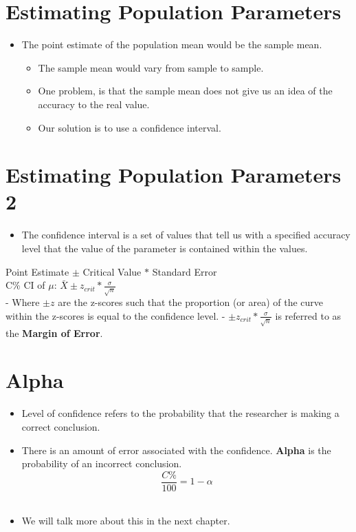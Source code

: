 \documentclass[12pt]{article}
\begin{document}
\section{Estimating Population
Parameters}\label{estimating-population-parameters}

\begin{itemize}
\itemsep1pt\parskip0pt
\item
  The point estimate of the population mean would be the sample mean.

  \begin{itemize}
  \itemsep1pt\parskip0pt
  \item
    The sample mean would vary from sample to sample.
  \item
    One problem, is that the sample mean does not give us an idea of the
    accuracy to the real value.
  \item
    Our solution is to use a confidence interval.
  \end{itemize}
\end{itemize}

\section{Estimating Population Parameters
2}\label{estimating-population-parameters-2}

\begin{itemize}
\itemsep1pt\parskip0pt
\item
  The confidence interval is a set of values that tell us with a
  specified accuracy level that the value of the parameter is contained
  within the values.
\end{itemize}

Point Estimate \(\pm\) Critical Value \(*\) Standard Error\\C\% CI of
\(\mu\): \(\bar{X} \pm z_{crit} * \frac{\sigma}{\sqrt{n}}\)\\- Where
\(\pm z\) are the z-scores such that the proportion (or area) of the
curve within the z-scores is equal to the confidence level. -
\(\pm z_{crit} * \frac{\sigma}{\sqrt{n}}\) is referred to as the
\textbf{Margin of Error}.

\section{Alpha}\label{alpha}

\begin{itemize}
\itemsep1pt\parskip0pt
\item
  Level of confidence refers to the probability that the researcher is
  making a correct conclusion.\\
\item
  There is an amount of error associated with the confidence.
  \textbf{Alpha} is the probability of an incorrect
  conclusion.\\\[ \frac{C\%}{100} = 1 - \alpha \]\\
\item
  We will talk more about this in the next chapter.
\end{itemize}
\end{document}
